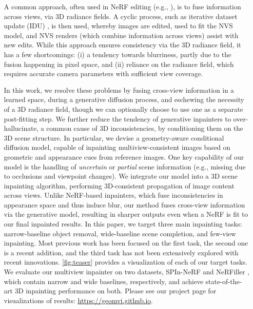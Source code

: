 A common approach, often used in NeRF editing (e.g., \cite{weber2024nerfiller}), is to fuse information across views, via 3D
radiance fields.
A cyclic process, such as iterative dataset update (IDU) \cite{in2n}, is then used, whereby images are edited, used to fit the NVS model, and NVS renders (which combine information across views) assist with new edits.
While this approach ensures consistency via the
3D radiance field, it has a few shortcomings: 
(i) a tendency towards blurriness, partly due to the fusion happening in pixel space, and
(ii) reliance on the radiance field, which requires accurate camera parameters with sufficient view coverage.

In this work, we resolve these problems by 
fusing cross-view information in a learned space, during a generative diffusion process, 
and eschewing the necessity of a 3D radiance field, though we can optionally choose to use one as a separate post-fitting step.
We further reduce the tendency of generative inpainters to over-hallucinate, a common cause of 3D inconsistencies, by conditioning them on the 3D scene structure.
In particular, we devise a geometry-aware conditional diffusion model, capable of inpainting multiview-consistent images based on geometric and appearance cues from reference images.
One key capability of our model is the handling of \textit{uncertain} or \textit{partial} scene information (e.g., missing due to occlusions and viewpoint changes).
We integrate our model into a 3D scene inpainting algorithm, performing 3D-consistent propagation of image content across views. 
Unlike NeRF-based inpainters, which fuse inconsistencies in appearance space and thus induce blur, our method fuses cross-view information via the generative model, resulting in sharper outputs even when a NeRF is fit to our final inpainted results. 
In this paper, we target three main inpainting tasks: narrow-baseline object removal,
wide-baseline scene completion, and few-view inpainting.
Most previous work has been focused on the first task, the second one
is a recent addition, and the third task has not been 
extensively explored with recent innovations. \cref{fig:teaser} provides a visualization of each of our target tasks.
We evaluate our multiview inpainter on two datasets, SPIn-NeRF \cite{spinnerf} and NeRFiller \cite{weber2024nerfiller}, which contain narrow and wide baselines, respectively, and achieve state-of-the-art 3D inpainting performance on both.
Please see our project page for visualizations of results: \href{https://geomvi.github.io/}{https://geomvi.github.io}.



















